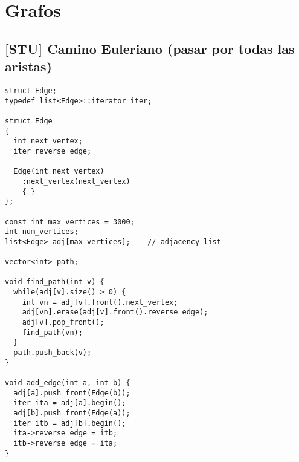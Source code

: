 \documentclass[10pt, a4, oneside]{article}
\begin{document}
\section{Grafos}
\subsection{[STU] Camino Euleriano (pasar por todas las aristas)}
\begin{verbatim}
struct Edge;
typedef list<Edge>::iterator iter;

struct Edge
{
  int next_vertex;
  iter reverse_edge;

  Edge(int next_vertex)
    :next_vertex(next_vertex)
    { }
};

const int max_vertices = 3000;
int num_vertices;
list<Edge> adj[max_vertices];    // adjacency list

vector<int> path;

void find_path(int v) {
  while(adj[v].size() > 0) {
    int vn = adj[v].front().next_vertex;
    adj[vn].erase(adj[v].front().reverse_edge);
    adj[v].pop_front();
    find_path(vn);
  }
  path.push_back(v);
}

void add_edge(int a, int b) {
  adj[a].push_front(Edge(b));
  iter ita = adj[a].begin();
  adj[b].push_front(Edge(a));
  iter itb = adj[b].begin();
  ita->reverse_edge = itb;
  itb->reverse_edge = ita;
}
\end{verbatim}
\end{document}

